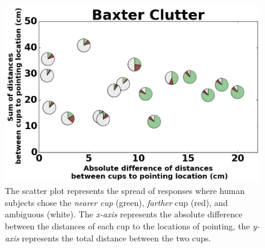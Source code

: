 \begin{figure}[H]
    \centering
    \includegraphics[width=\linewidth]{figures/baxter_Clutter_granular.png}
    \caption{
    The scatter plot represents the spread of responses where human subjects chose the \textit{nearer cup} (green), \textit{farther} cup (red), and ambiguous (white). 
    The \textit{x-axis} represents the absolute difference between the distances of each cup to the locations of pointing, the \textit{y-axis} represents the total distance between the two cups.
    }
    \label{fig:cluttered}
\end{figure}